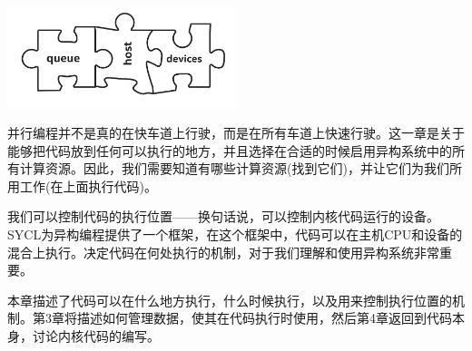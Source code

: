\begin{center}
	\includegraphics[width=0.5\textwidth]{content/chapter-2/images/1}
\end{center}

并行编程并不是真的在快车道上行驶，而是在所有车道上快速行驶。这一章是关于能够把代码放到任何可以执行的地方，并且选择在合适的时候启用异构系统中的所有计算资源。因此，我们需要知道有哪些计算资源(找到它们)，并让它们为我们所用工作(在上面执行代码)。\par

我们可以控制代码的执行位置——换句话说，可以控制内核代码运行的设备。SYCL为异构编程提供了一个框架，在这个框架中，代码可以在主机CPU和设备的混合上执行。决定代码在何处执行的机制，对于我们理解和使用异构系统非常重要。\par

本章描述了代码可以在什么地方执行，什么时候执行，以及用来控制执行位置的机制。第3章将描述如何管理数据，使其在代码执行时使用，然后第4章返回到代码本身，讨论内核代码的编写。\par